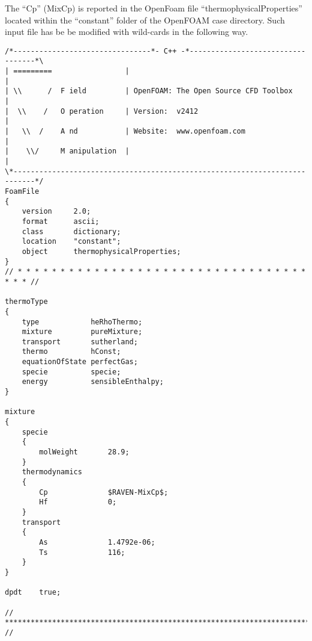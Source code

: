 The ``Cp''  (MixCp) is reported in the OpenFoam file ``thermophysicalProperties'' located within the ``constant'' folder of the OpenFOAM case directory.
Such input file has be be modified with wild-cards in the following way.
\begin{lstlisting}[basicstyle=\tiny]
/*--------------------------------*- C++ -*----------------------------------*\
| =========                 |                                                 |
| \\      /  F ield         | OpenFOAM: The Open Source CFD Toolbox           |
|  \\    /   O peration     | Version:  v2412                                 |
|   \\  /    A nd           | Website:  www.openfoam.com                      |
|    \\/     M anipulation  |                                                 |
\*---------------------------------------------------------------------------*/
FoamFile
{
    version     2.0;
    format      ascii;
    class       dictionary;
    location    "constant";
    object      thermophysicalProperties;
}
// * * * * * * * * * * * * * * * * * * * * * * * * * * * * * * * * * * * * * //

thermoType
{
    type            heRhoThermo;
    mixture         pureMixture;
    transport       sutherland;
    thermo          hConst;
    equationOfState perfectGas;
    specie          specie;
    energy          sensibleEnthalpy;
}

mixture
{
    specie
    {
        molWeight       28.9;
    }
    thermodynamics
    {
        Cp              $RAVEN-MixCp$;
        Hf              0;
    }
    transport
    {
        As              1.4792e-06;
        Ts              116;
    }
}

dpdt    true;

// ************************************************************************* //
\end{lstlisting}

